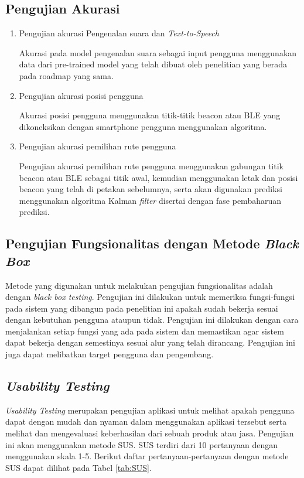 \subsection{Pengujian Akurasi}
\begin{enumerate}
\item Pengujian akurasi Pengenalan suara dan \textit{Text-to-Speech}
\par Akurasi pada model pengenalan suara sebagai input pengguna menggunakan data dari pre-trained model yang telah dibuat oleh penelitian yang berada pada roadmap yang sama.

\item Pengujian akurasi posisi pengguna
\par Akurasi posisi pengguna menggunakan titik-titik beacon atau BLE yang dikoneksikan dengan smartphone pengguna menggunakan algoritma.

\item Pengujian akurasi pemilihan rute pengguna
\par Pengujian akurasi pemilihan rute pengguna menggunakan gabungan titik beacon atau BLE sebagai titik awal, kemudian menggunakan letak dan posisi beacon yang telah di petakan sebelumnya, serta akan digunakan prediksi menggunakan algoritma Kalman \textit{filter} disertai dengan fase pembaharuan prediksi.

\par 

\end{enumerate}

\subsection{Pengujian Fungsionalitas dengan Metode \textit{Black Box}}
Metode yang digunakan untuk melakukan pengujian fungsionalitas adalah dengan \textit{black box testing}. Pengujian ini dilakukan untuk memeriksa fungsi-fungsi pada sistem yang dibangun pada penelitian ini apakah sudah bekerja sesuai dengan kebutuhan pengguna ataupun tidak. Pengujian ini dilakukan dengan cara menjalankan setiap fungsi yang ada pada sistem dan memastikan agar sistem dapat bekerja dengan semestinya sesuai alur yang telah dirancang. Pengujian ini juga dapat melibatkan target pengguna dan pengembang.

\subsection{\textit{Usability Testing}}
\textit{Usability Testing} merupakan pengujian aplikasi untuk melihat apakah pengguna dapat dengan mudah dan nyaman dalam menggunakan aplikasi tersebut serta melihat dan mengevaluasi keberhasilan dari sebuah produk atau jasa. Pengujian ini akan menggunakan metode SUS. SUS terdiri dari 10 pertanyaan dengan menggunakan skala 1-5. Berikut daftar pertanyaan-pertanyaan dengan metode SUS dapat dilihat pada Tabel \ref{tab:SUS}.

